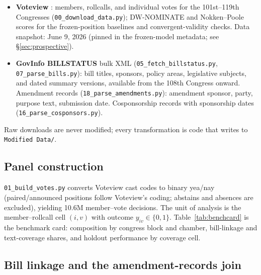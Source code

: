 \documentclass[11pt]{article}
\newcommand{\code}[1]{\texttt{#1}}
\begin{document}
\begin{itemize}
\item \textbf{Voteview} \citep{lewis2026voteview}: members, rollcalls,
and individual votes for the 101st--119th Congresses
(\code{00\_download\_data.py}); DW-NOMINATE and Nokken--Poole scores for
the frozen-position baselines and convergent-validity checks. Data
snapshot: June 9, 2026 (pinned in the frozen-model metadata; see
\S\ref{sec:prospective}).
\item \textbf{GovInfo BILLSTATUS} bulk XML
(\code{05\_fetch\_billstatus.py}, \code{07\_parse\_bills.py}): bill
titles, sponsors, policy areas, legislative subjects, and dated summary
versions, available from the 108th Congress onward. Amendment records
(\code{18\_parse\_amendments.py}): amendment sponsor, party, purpose
text, submission date. Cosponsorship records with sponsorship dates
(\code{16\_parse\_cosponsors.py}).
\end{itemize}

Raw downloads are never modified; every transformation is code that
writes to \code{Modified Data/}.

\subsection{Panel construction}

\code{01\_build\_votes.py} converts Voteview cast codes to binary
yea/nay (paired/announced positions follow Voteview's coding; abstains
and absences are excluded), yielding 10.6M member--vote decisions. The
unit of analysis is the member--rollcall cell $(i, v)$ with outcome
$y_{iv} \in \{0, 1\}$. Table~\ref{tab:benchcard} is the benchmark card:
composition by congress block and chamber, bill-linkage and
text-coverage shares, and holdout performance by coverage cell.

\begin{table}[tbp]
\centering
\caption{Benchmark card (script \code{37\_benchmark\_card.py}).
``Bill-linked'' is the share of rollcalls tied to a legislative
measure; ``pre-vote summary'' the share whose leakage-clean text
template draws on a CRS summary dated strictly before the vote; ``title
only'' the share whose bill text is a title.}
\label{tab:benchcard}
{\footnotesize }
\end{table}

\subsection{Bill linkage and the amendment-records join}
\end{document}
